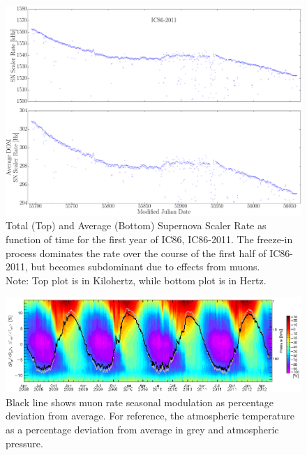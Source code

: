 \begin{figure}[h]
  \begin{center}
    \includegraphics[width=1\textwidth]{./figures/SNScalerRateTotalAvgIC86I.png} 
  \end{center}
  \caption{ Total (Top) and Average (Bottom) Supernova Scaler Rate as function of time for the first year of IC86, IC86-2011. The freeze-in process dominates the rate over the course of the first half of IC86-2011, but becomes subdominant due to effects from muons. \\
  Note: Top plot is in Kilohertz, while bottom plot is in Hertz.\label{fig:snscalerIC86I}}   
\end{figure}

\begin{figure}
  \begin{center}
    \includegraphics[width=1\textwidth]{./figures/airs_dst_teff_daily.png}
  \end{center}
  \caption{Black line shows muon rate seasonal modulation as percentage deviation from average. For reference, the atmospheric temperature as a percentage deviation from average in grey and atmospheric pressure. \label{fig:muonseasonal}}   
\end{figure}

